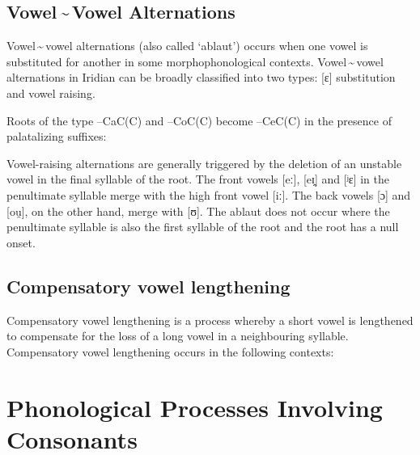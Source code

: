 \subsection{Vowel\,\sim\,Vowel Alternations}
Vowel\,\sim\,vowel alternations (also called `ablaut') occurs when one vowel is
substituted for another in some morphophonological contexts. Vowel\,\sim\,vowel
alternations in Iridian can be broadly classified into two types: [ɛ]
substitution and vowel raising.

Roots of the type --CaC(C) and --CoC(C) become --CeC(C) in the
presence of palatalizing suffixes:

\ex
{}
\xe

Vowel-raising alternations are generally triggered by the deletion of an
unstable vowel in the final syllable of the root. The front vowels [eː], [eɪ̯]
and [ʲɛ] in the penultimate syllable merge with the high front vowel [iː]. The
back vowels [ɔ] and [ou̯], on the other hand, merge with [ʊ]. The ablaut does
not occur where the penultimate syllable is also the first syllable of the root
and the root has a null onset.

\ex
{}
\xe


\subsection{Compensatory vowel lengthening}

Compensatory vowel lengthening is a process whereby a short vowel is lengthened
to compensate for the loss of a long vowel in a neighbouring syllable.
Compensatory vowel lengthening occurs in the following contexts:



\section{Phonological Processes Involving Consonants}

